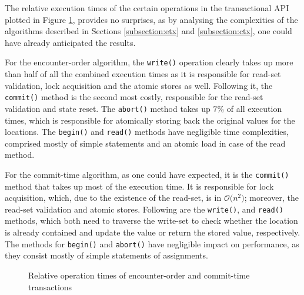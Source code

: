 The relative execution times of the certain operations in the transactional API plotted in Figure \ref{fig:op-times}, provides no surprises, as by analysing the complexities of the algorithms described in Sections \ref{subsection:etx} and \ref{subsection:ctx}, one could have already anticipated the results. 

For the encounter-order algorithm, the \texttt{write()} operation clearly takes up more than half of all the combined execution times as it is responsible for read-set validation, lock acquisition and the atomic stores as well. Following it, the \texttt{commit()} method is the second most costly, responsible for the read-set validation and state reset. The \texttt{abort()} method takes up $7\%$ of all execution times, which is responsible for atomically storing back the original values for the locations. The \texttt{begin()} and \texttt{read()} methods have negligible time complexities, comprised mostly of simple statements and an atomic load in case of the read method. 

For the commit-time algorithm, as one could have expected, it is the \texttt{commit()} method that takes up most of the execution time. It is responsible for lock acquisition, which, due to the existence of the read-set, is in $\mathcal{O}\text{(}n^2\text{)}$; moreover, the read-set validation and atomic stores. Following are the \texttt{write()}, and \texttt{read()} methods, which both need to traverse the write-set to check whether the location is already contained and update the value or return the stored value, respectively. The methods for \texttt{begin()} and \texttt{abort()} have negligible impact on performance, as they consist mostly of simple statements of assignments.

\begin{figure}[!htb]
    \centering
    \caption{Relative operation times of encounter-order and commit-time transactions}
    \label{fig:op-times}
\end{figure}

